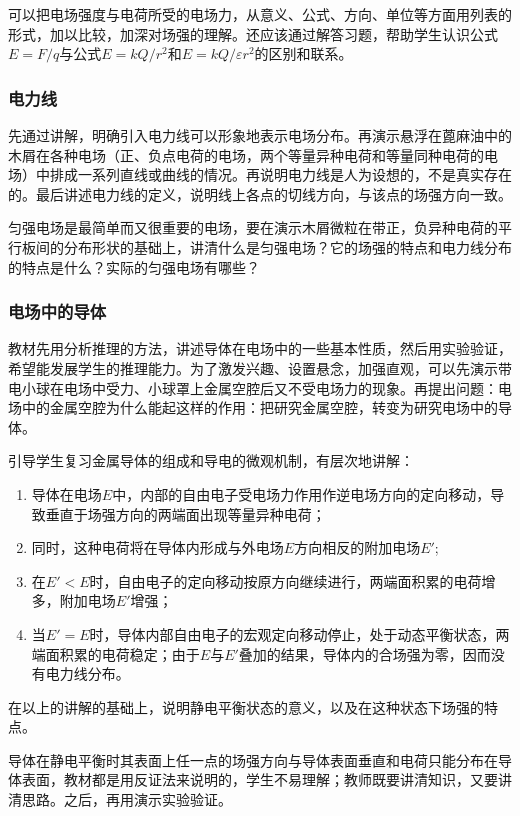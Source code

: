 可以把电场强度与电荷所受的电场力，从意义、公式、方向、单位等方面用列表的形式，加以比较，加深对场强的理解。还应该通过解答习题，帮助学生认识公式$E=F/q$与公式$E=kQ/r^2$和$E=kQ/\varepsilon r^2$的区别和联系。

\subsubsection{电力线}

先通过讲解，明确引入电力线可以形象地表示电场分布。再演示悬浮在蓖麻油中的木屑在各种电场（正、负点电荷的电场，两个等量异种电荷和等量同种电荷的电场）中排成一系列直线或曲线的情况。再说明电力线是人为设想的，不是真实存在的。最后讲述电力线的定义，说明线上各点的切线方向，与该点的场强方向一致。

匀强电场是最简单而又很重要的电场，要在演示木屑微粒在带正，负异种电荷的平行板间的分布形状的基础上，讲清什么是匀强电场？它的场强的特点和电力线分布的特点是什么？实际的匀强电场有哪些？

\subsubsection{电场中的导体}

教材先用分析推理的方法，讲述导体在电场中的一些基本性质，然后用实验验证，希望能发展学生的推理能力。为了激发兴趣、设置悬念，加强直观，可以先演示带电小球在电场中受力、小球罩上金属空腔后又不受电场力的现象。再提出问题：电场中的金属空腔为什么能起这样的作用：把研究金属空腔，转变为研究电场中的导体。

引导学生复习金属导体的组成和导电的微观机制，有层次地讲解：
\begin{enumerate}
\item 导体在电场$E$中，内部的自由电子受电场力作用作逆电场方向的定向移动，导致垂直于场强方向的两端面出现等量异种电荷；
\item 同时，这种电荷将在导体内形成与外电场$E$方向相反的附加电场$E'$;
\item 在$E'<E$时，自由电子的定向移动按原方向继续进行，两端面积累的电荷增多，附加电场$E'$增强；
\item 当$E'=E$时，导体内部自由电子的宏观定向移动停止，处于动态平衡状态，两端面积累的电荷稳定；由于$E$与$E'$叠加的结果，导体内的合场强为零，因而没有电力线分布。
\end{enumerate}
在以上的讲解的基础上，说明静电平衡状态的意义，以及在这种状态下场强的特点。

导体在静电平衡时其表面上任一点的场强方向与导体表面垂直和电荷只能分布在导体表面，教材都是用反证法来说明的，学生不易理解；教师既要讲清知识，又要讲清思路。之后，再用演示实验验证。















